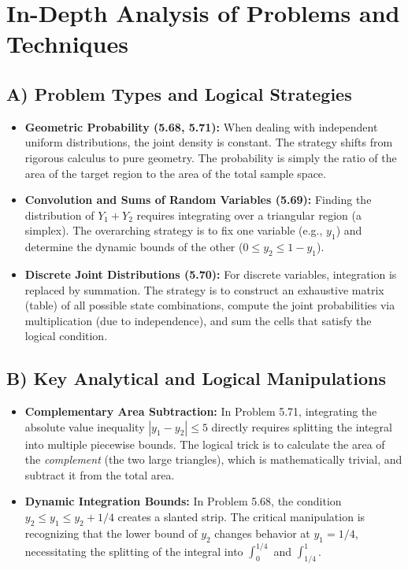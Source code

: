 \documentclass[11pt, a4paper]{article}
\theoremstyle{definition}
\theoremstyle{remark}
\begin{document}
\section{In-Depth Analysis of Problems and Techniques}

\subsection{A) Problem Types and Logical Strategies}
\begin{itemize}
    \item \textbf{Geometric Probability (5.68, 5.71):} When dealing with independent uniform distributions, the joint density is constant. The strategy shifts from rigorous calculus to pure geometry. The probability is simply the ratio of the area of the target region to the area of the total sample space.
    \item \textbf{Convolution and Sums of Random Variables (5.69):} Finding the distribution of $Y_1 + Y_2$ requires integrating over a triangular region (a simplex). The overarching strategy is to fix one variable (e.g., $y_1$) and determine the dynamic bounds of the other ($0 \leq y_2 \leq 1 - y_1$).
    \item \textbf{Discrete Joint Distributions (5.70):} For discrete variables, integration is replaced by summation. The strategy is to construct an exhaustive matrix (table) of all possible state combinations, compute the joint probabilities via multiplication (due to independence), and sum the cells that satisfy the logical condition.
\end{itemize}

\subsection{B) Key Analytical and Logical Manipulations}
\begin{itemize}
    \item \textbf{Complementary Area Subtraction:} In Problem 5.71, integrating the absolute value inequality $|y_1 - y_2| \leq 5$ directly requires splitting the integral into multiple piecewise bounds. The logical trick is to calculate the area of the \textit{complement} (the two large triangles), which is mathematically trivial, and subtract it from the total area.
    \item \textbf{Dynamic Integration Bounds:} In Problem 5.68, the condition $y_2 \leq y_1 \leq y_2 + 1/4$ creates a slanted strip. The critical manipulation is recognizing that the lower bound of $y_2$ changes behavior at $y_1 = 1/4$, necessitating the splitting of the integral into $\int_0^{1/4}$ and $\int_{1/4}^1$.
\end{itemize}
\end{document}
